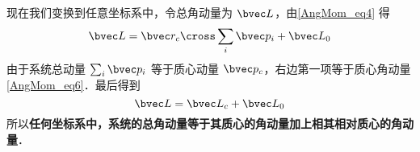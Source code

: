 现在我们变换到任意坐标系中，令总角动量为 $\bvec L$，由\autoref{AngMom_eq4} 得
\begin{equation}
\bvec L = \bvec r_{c} \cross \sum_i \bvec p_i + \bvec L_0
\end{equation}
由于系统总动量 $\sum_i \bvec p_i$ 等于质心动量 $\bvec p_c$，右边第一项等于质心角动量\autoref{AngMom_eq6}．最后得到
\begin{equation}
\bvec L = \bvec L_c + \bvec L_0
\end{equation}
所以\textbf{任何坐标系中，系统的总角动量等于其质心的角动量加上相其相对质心的角动量}．
